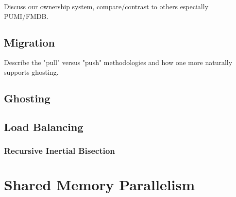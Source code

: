 Discuss our ownership system, compare/contrast to
others especially PUMI/FMDB.

\subsection{Migration}

Describe the "pull" versus "push" methodologies and
how one more naturally supports ghosting.

\subsection{Ghosting}

\subsection{Load Balancing}

\subsubsection{Recursive Inertial Bisection}

\section{Shared Memory Parallelism}


